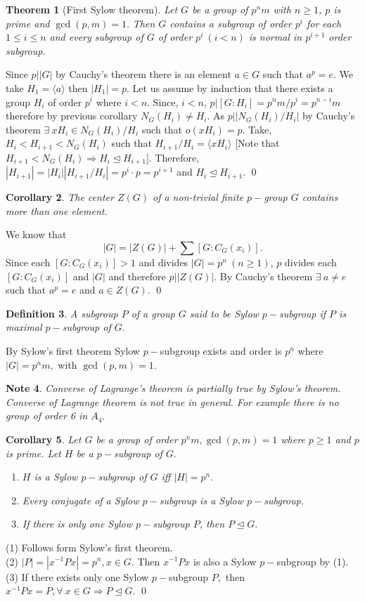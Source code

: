 \documentclass[11pt]{amsart}
\newtheorem{theorem}{Theorem}[section]
\newtheorem{defn}[theorem]{Definition}
\newtheorem{note}[theorem]{Note}
\newtheorem{corollary}[theorem]{Corollary}%
\newcommand{\gen}[1]{\langle#1\rangle}
\begin{document}
\begin{theorem}[First Sylow theorem]
Let $G$ be a group of $p^nm$ with $n\geq 1$, $p$ is prime and $\gcd(p,m)=1.$ Then $G$ contains a subgroup of order $p^i$ for each $1\leq i\leq n$ and every subgroup of $G$ of order $p^i~ (i<n)$ is normal in $p^{i+1}$ order subgroup.
\end{theorem}
\proof Since $p\big| |G|$ by Cauchy's theorem there is an element $a\in G$ such that $a^p=e$. We take $H_1=\gen{a}$ then $|H_1|=p.$ Let us assume by induction that there exists a group $H_i$ of order $p^i$ where $i<n.$ Since, $i<n$, $p\big| [G:H_i]=p^nm/p^i=p^{n-i}m$ therefore by previous corollary $N_G(H_i)\neq H_i$. As $p\big| |N_G(H_i)/H_i|$ by Cauchy's theorem $\exists~xH_i\in N_G(H_i)/H_i$ such that $o(xH_i)=p.$ Take, $H_i<H_{i+1}<N_G(H_i)$ such that $H_{i+1}/H_i=\gen{xH_i}$ [Note that $H_{i+1}<N_G(H_i) \Rightarrow H_i\mathrel{\unlhd} H_{i+1}$]. Therefore, $|H_{i+1}|=|H_i||H_{i+1}/H_i|=p^i\cdot p=p^{i+1}$ and $H_i\mathrel{\unlhd} H_{i+1}.$ \qed

\begin{corollary}
The center $Z(G)$ of a non-trivial finite $p-$group $G$ contains more than one element.
\end{corollary}
\proof We know that $$|G|=|Z(G)|+\displaystyle\sum [G:C_G(x_i)].$$ Since each $[G:C_G(x_i)]>1$ and divides $|G|=p^n~(n\geq 1)$, $p$ divides each $[G:C_G(x_i)]$ and $|G|$ and therefore $p\big| |Z(G)|$. By Cauchy's theorem $\exists~a\neq e$ such that $a^p=e$ and $a\in Z(G).$ \qed
\begin{defn}
A subgroup $P$ of a group $G$ said to be Sylow $p-$subgroup if $P$ is maximal $p-$subgroup of $G.$
\end{defn}
By Sylow's first theorem Sylow $p-$subgroup exists and order is $p^n$ where $|G|=p^nm,$ with $\gcd(p,m)=1.$
\begin{note}
Converse of Lagrange's theorem is partially true by Sylow's theorem. Converse of Lagrange theorem is not true in general. For example there is no group of order 6 in $A_4.$
\end{note}
\begin{corollary}
Let $G$ be a group of order $p^nm,\gcd(p,m)=1$ where $p\geq 1$ and $p$ is prime. Let $H$ be a $p-$subgroup of $G.$
\begin{enumerate}
\item $H$ is a Sylow $p-$subgroup of $G$ iff $|H|=p^n.$
\item Every conjugate of a Sylow $p-$subgroup is a Sylow $p-$subgroup.
\item If there is only one Sylow $p-$subgroup $P$, then $P\mathrel{\unlhd} G.$
\end{enumerate}

\end{corollary}
\proof (1) Follows form Sylow's first theorem.\\
(2) $|P|=|x^{-1}Px|=p^n,x\in G.$ Then $x^{-1}Px$ is also a Sylow $p-$subgroup by (1).\\
(3) If there exists only one Sylow $p-$subgroup $P,$ then $x^{-1}Px=P,\forall~x\in G \Rightarrow P\mathrel{\unlhd} G.$ \qed
\end{document}
